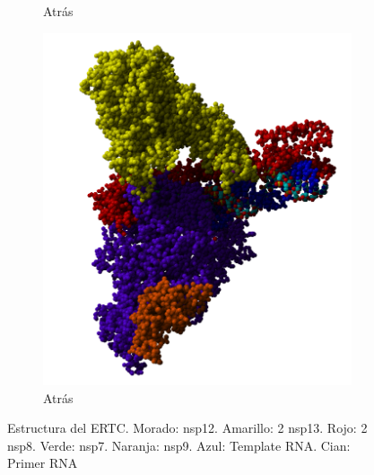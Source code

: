 \documentclass[a4paper,11pt]{report}
\begin{document}
\begin{figure}[h]
\begin{subfigure}{0.3\textwidth}
	 	\caption{Atrás} 	
    \end{subfigure}
	 \begin{subfigure}{0.3\textwidth}
		\includegraphics[width=\linewidth]{Figuras/Figura41}
		\caption{Atrás} 	
	\end{subfigure}
  \caption{Estructura del ERTC. Morado: nsp12. Amarillo: 2 nsp13. Rojo: 2 nsp8. Verde: nsp7. Naranja: nsp9. Azul: Template RNA. Cian: Primer RNA}
  
 \end{figure}
 
\end{document}
